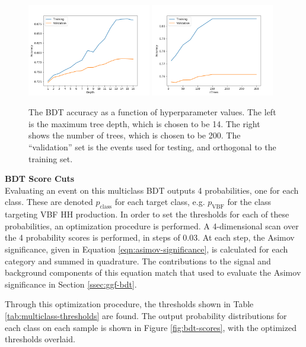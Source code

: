 \begin{figure}[!h]
  \centering
  \includegraphics[width=0.48\textwidth]{chapters/chapter6_vbf/images/hp_opt/multiclass_optimized_depth.png}
  \includegraphics[width=0.48\textwidth]{chapters/chapter6_vbf/images/hp_opt/multiclass_optimized_trees.png}
  \caption[The \gls{BDT} accuracy as a function of hyperparameter values]{The \gls{BDT} accuracy as a function of hyperparameter values. The left is the maximum tree depth, which is chosen to be 14. The right shows the number of trees, which is chosen to be 200. The ``validation'' set is the events used for testing, and orthogonal to the training set.}
  \label{fig:hp-opt}
\end{figure}

\noindent\textbf{BDT Score Cuts}\\
\indent Evaluating an event on this multiclass \gls{BDT} outputs 4 probabilities, one for each class. These are denoted $p_{\text{class}}$ for each target class, e.g. $p_{\text{VBF}}$ for the class targeting VBF HH production. In order to set the thresholds for each of these probabilities, an optimization procedure is performed. A 4-dimensional scan over the 4 probability scores is performed, in steps of 0.03. At each step, the Asimov significance, given in Equation \ref{eqn:asimov-significance}, is calculated for each category and summed in quadrature. The contributions to the signal and background components of this equation match that used to evaluate the Asimov significance in Section \ref{ssec:ggf-bdt}.

Through this optimization procedure, the thresholds shown in Table \ref{tab:multiclass-thresholds} are found. The output probability distributions for each class on each sample is shown in Figure \ref{fig:bdt-scores}, with the optimized thresholds overlaid.

